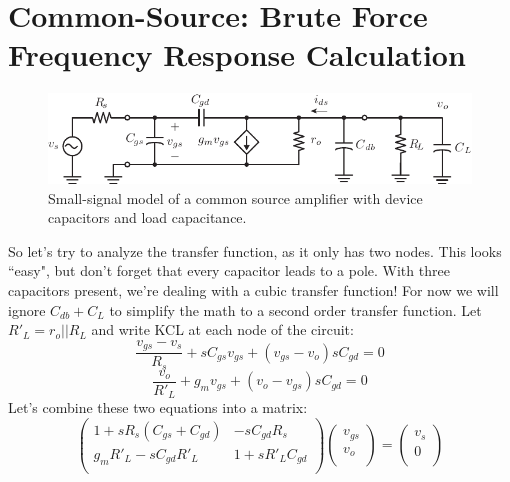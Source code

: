 \section{Common-Source:  Brute Force Frequency Response Calculation}
\begin{figure}[tb]
\centering
\includegraphics[scale=1]{cs_amp_ac_caps}
\caption{Small-signal model of a common source amplifier with device capacitors and load capacitance.} \label{fig:cs_amp_ac_caps}
\end{figure}
So let's try to analyze the transfer function, as it only has two nodes.  This looks ``easy", but don't forget that every capacitor leads to a pole.  With three capacitors present, we're dealing with a cubic transfer function! For now we will ignore $C_{db}+C_L$ to simplify the math to a second order transfer function.  
Let $R'_L = r_o || R_L$ and write KCL at each node of the circuit:
    \begin{equation}
        \frac{v_{gs} - v_s}{R_s} + s C_{gs} v_{gs} + (v_{gs} - v_o) s C_{gd} = 0
    \end{equation}
    \begin{equation}
        \frac{v_o}{R'_L} + g_m v_{gs} + (v_o - v_{gs}) s C_{gd} = 0 
    \end{equation}
Let's combine these two equations into a matrix:
    \begin{equation}
        \begin{pmatrix}
        1 + s R_s (C_{gs} + C_{gd}) & -s C_{gd} R_s \\
        g_m R'_L - s C_{gd} R'_L & 1 + s R'_L C_{gd}\\
        \end{pmatrix}
        \begin{pmatrix}
        v_{gs} \\ v_o\\
        \end{pmatrix} 	
        =
        \begin{pmatrix}
        v_s \\ 0\\
        \end{pmatrix} 
    \end{equation}
